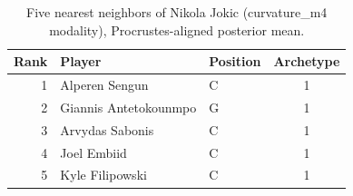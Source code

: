 \begin{table}[htbp]
  \centering\small
  \begin{tabular}{rllc}
    \toprule
    Rank & Player & Position & Archetype \\
    \midrule
    1 & Alperen Sengun & C & 1 \\
    2 & Giannis Antetokounmpo & G & 1 \\
    3 & Arvydas Sabonis & C & 1 \\
    4 & Joel Embiid & C & 1 \\
    5 & Kyle Filipowski & C & 1 \\
    \bottomrule
  \end{tabular}
  \caption{Five nearest neighbors of Nikola Jokic (curvature_m4 modality), Procrustes-aligned posterior mean.}
  \label{tab:Nikola_Jokic_neighbors_curvature_m4}
\end{table}


